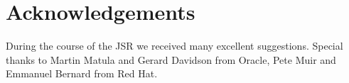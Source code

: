 \section{Acknowledgements}

During the course of the JSR we received many excellent suggestions. Special thanks to Martin Matula and Gerard Davidson from Oracle, Pete Muir and Emmanuel Bernard from Red Hat.



